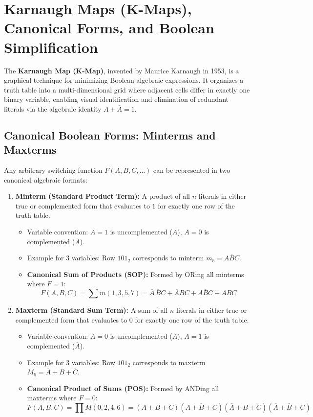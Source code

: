 \section{Karnaugh Maps (K-Maps), Canonical Forms, and Boolean Simplification}
\label{sec:karnaugh_maps}

The \textbf{Karnaugh Map (K-Map)}, invented by Maurice Karnaugh in 1953, is a graphical technique for minimizing Boolean algebraic expressions. It organizes a truth table into a multi-dimensional grid where adjacent cells differ in exactly one binary variable, enabling visual identification and elimination of redundant literals via the algebraic identity $A + \overline{A} = 1$.

\subsection{Canonical Boolean Forms: Minterms and Maxterms}
Any arbitrary switching function $F(A, B, C, \dots)$ can be represented in two canonical algebraic formats:

\begin{enumerate}[label=\bfseries\arabic*.]
    \item \textbf{Minterm (Standard Product Term):} A product of all $n$ literals in either true or complemented form that evaluates to $1$ for exactly one row of the truth table.
    \begin{itemize}
        \item Variable convention: $A = 1$ is uncomplemented ($A$), $A = 0$ is complemented ($\overline{A}$).
        \item Example for 3 variables: Row $101_2$ corresponds to minterm $m_5 = A \overline{B} C$.
        \item \textbf{Canonical Sum of Products (SOP):} Formed by ORing all minterms where $F = 1$:
        \begin{equation}
        \label{eq:canonical_sop}
        F(A, B, C) = \sum m(1, 3, 5, 7) = \overline{A}\,\overline{B}C + \overline{A}BC + A\overline{B}C + ABC
        \end{equation}
    \end{itemize}
    \item \textbf{Maxterm (Standard Sum Term):} A sum of all $n$ literals in either true or complemented form that evaluates to $0$ for exactly one row of the truth table.
    \begin{itemize}
        \item Variable convention: $A = 0$ is uncomplemented ($A$), $A = 1$ is complemented ($\overline{A}$).
        \item Example for 3 variables: Row $101_2$ corresponds to maxterm $M_5 = \overline{A} + B + \overline{C}$.
        \item \textbf{Canonical Product of Sums (POS):} Formed by ANDing all maxterms where $F = 0$:
        \begin{equation}
        \label{eq:canonical_pos}
        F(A, B, C) = \prod M(0, 2, 4, 6) = (A + B + C)(A + \overline{B} + C)(\overline{A} + B + C)(\overline{A} + \overline{B} + C)
        \end{equation}
    \end{itemize}
\end{enumerate}

